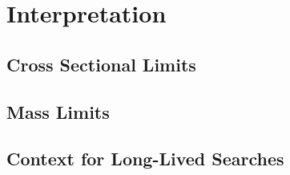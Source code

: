 \chapter{Interpretation}

\label{ch:interpretation}

\section{Cross Sectional Limits}


\section{Mass Limits}


\section{Context for Long-Lived Searches}

